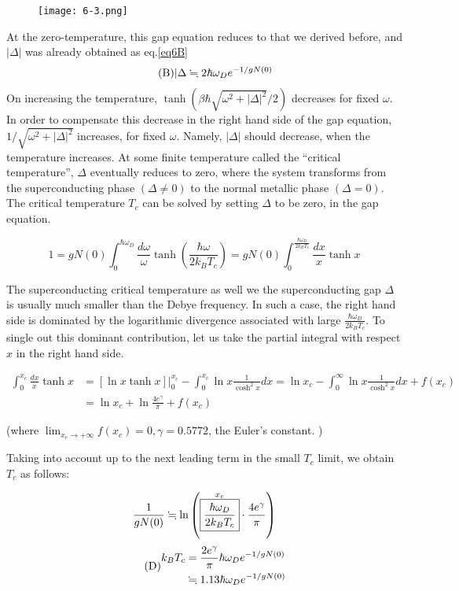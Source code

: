 \begin{wrapfigure}{l}{6cm}
\texttt{[image: 6-3.png]}\
\end{wrapfigure}

At the zero-temperature, this gap equation reduces to that we derived before, and $|\Delta|$ was already obtained as eq.\eqref{eq6B}
\begin{align}\tag{B}
|\Delta \fallingdotseq 2\hbar\omega_D e^{-1/gN(0)}
\end{align}
On increasing the temperature, $\tanh({\beta\hbar\sqrt{\omega^2+|\Delta|^2}}/{2})$ decreases for fixed $\omega$. In order to compensate this decrease in the right hand side of the gap equation, $1/\sqrt{\omega^2+|\Delta|^2}$ increases, for fixed $\omega$. Namely, $|\Delta|$ should decrease, when the temperature increases. At some finite temperature called the ``critical temperature'', $\Delta$ eventually reduces to zero, where the system transforms from the superconducting phase $(\Delta\neq0)$ to the normal metallic phase $(\Delta=0)$. The critical temperature $T_c$ can be solved by setting $\Delta$ to be zero, in the gap equation. 

\[1 = gN(0)\int_0^{\hbar\omega_D}\frac{d\omega}{\omega}\tanh\left(\frac{\hbar\omega}{2k_BT_c}\right) = gN(0)\int_0^{\frac{\hbar\omega_D}{2k_BT_c}}\frac{dx}{x}\tanh x \]

The superconducting critical temperature as well we the superconducting gap $\Delta$ is usually much smaller than the Debye frequency. In such a case, the right hand side is dominated by the logarithmic divergence associated with large $\displaystyle \frac{\hbar\omega_D}{2k_BT_c}$. To single out this dominant contribution, let us take the partial integral with respect $x$ in the right hand side. 

\[\begin{split}
\int_0^{x_c}\frac{dx}{x}\tanh x &= [\ln x\tanh x]\Big|_0^{x_c} - \int_0^{x_c}\ln x\frac{1}{\cosh^2 x}dx = \ln x_c - \int_0^{\infty}\ln x\frac{1}{\cosh^2 x}dx + f(x_c)\\
&=\ln x_c + \ln \frac{4e^\gamma}{\pi}+f(x_c)
\end{split}\]

(where $\displaystyle\lim_{x_c\to+\infty} f(x_c) = 0, \gamma = 0.5772$, the Euler's constant. )

Taking into account up to the next leading term in the small $T_c$ limit, we obtain $T_c$ as follows:

\[\frac{1}{gN(0)}\fallingdotseq\ln\left(\overset{x_c}{\fbox{${\displaystyle\frac{\hbar\omega_D}{2k_BT_c}}$}}\cdot\frac{4e^\gamma}{\pi}\right) \]
\begin{align}\tag{D}\label{eq6D}
\begin{split}
k_BT_c &= \frac{2e^\gamma}{\pi}\hbar\omega_D e^{-1/gN(0)}\\
&\fallingdotseq 1.13\hbar\omega_D e^{-1/gN(0)}
\end{split}
\end{align}

